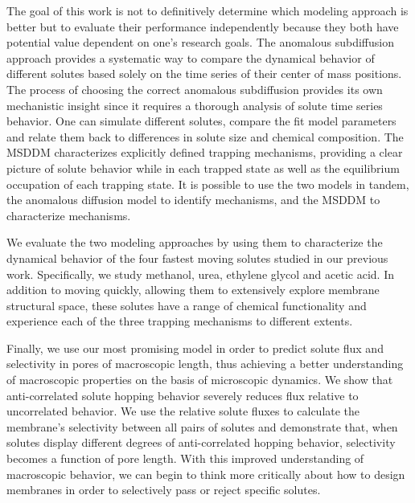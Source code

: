 \documentclass{article}
\begin{document}
  The goal of this work is not to definitively determine which modeling approach
  is better but to evaluate their performance independently because they both
  have potential value dependent on one's research goals. The anomalous subdiffusion
  approach provides a systematic way to compare the dynamical behavior of different
  solutes based solely on the time series of their center of mass positions. The process
  of choosing the correct anomalous subdiffusion provides its own mechanistic insight
  since it requires a thorough analysis of solute time series behavior. One can simulate
  different solutes, compare the fit model parameters and relate them back to 
  differences in solute size and chemical composition. The MSDDM characterizes 
  explicitly defined trapping mechanisms, providing a clear picture of solute behavior
  while in each trapped state as well as the equilibrium occupation of each trapping state.
  It is possible to use the two models in tandem, the anomalous diffusion model to
  identify mechanisms, and the MSDDM to characterize mechanisms. 
  
  We evaluate the two modeling approaches by using them to characterize the dynamical
  behavior of the four fastest moving solutes studied in our previous work.
  Specifically, we study methanol, urea, ethylene glycol and acetic acid. In addition
  to moving quickly, allowing them to extensively explore membrane structural space,
  these solutes have a range of chemical functionality and experience each of the 
  three trapping mechanisms to different extents.
  
  Finally, we use our most promising model in order to predict solute flux and 
  selectivity in pores of macroscopic length, thus achieving a better understanding
  of macroscopic properties on the basis of microscopic dynamics. We show that 
  anti-correlated solute hopping behavior severely reduces flux relative to 
  uncorrelated behavior. We use the relative solute fluxes to calculate the 
  membrane's selectivity between all pairs of solutes and demonstrate that, when 
  solutes display different degrees of anti-correlated hopping behavior, selectivity
  becomes a function of pore length. With this improved understanding of 
  macroscopic behavior, we can begin to think more critically about how to design 
  membranes in order to selectively pass or reject specific solutes.
  
  
\end{document}
